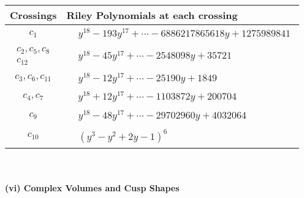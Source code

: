 \documentclass[1p]{elsarticle_modified}
\theoremstyle{definition}
\begin{document}
\begin{tabular}{m{50pt}|m{274pt}}
Crossings & \hspace{64pt}Riley Polynomials at each crossing \\
\hline $$\begin{aligned}c_{1}\end{aligned}$$&$\begin{aligned}
&y^{18}-193 y^{17}+\cdots-6886217865618 y+1275989841
\end{aligned}$\\
\hline $$\begin{aligned}c_{2},c_{5},c_{8}\\c_{12}\end{aligned}$$&$\begin{aligned}
&y^{18}-45 y^{17}+\cdots-2548098 y+35721
\end{aligned}$\\
\hline $$\begin{aligned}c_{3},c_{6},c_{11}\end{aligned}$$&$\begin{aligned}
&y^{18}-12 y^{17}+\cdots-25190 y+1849
\end{aligned}$\\
\hline $$\begin{aligned}c_{4},c_{7}\end{aligned}$$&$\begin{aligned}
&y^{18}+12 y^{17}+\cdots-1103872 y+200704
\end{aligned}$\\
\hline $$\begin{aligned}c_{9}\end{aligned}$$&$\begin{aligned}
&y^{18}-48 y^{17}+\cdots-29702960 y+4032064
\end{aligned}$\\
\hline $$\begin{aligned}c_{10}\end{aligned}$$&$\begin{aligned}
&(y^3- y^2+2 y-1)^6
\end{aligned}$\\
\hline
\end{tabular}\\~\\
\newpage\flushleft \textbf{(vi) Complex Volumes and Cusp Shapes}
\end{document}
